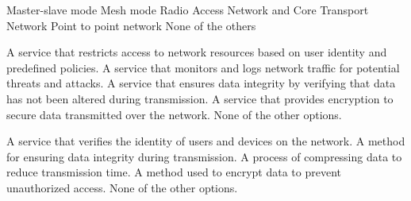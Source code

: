 \begin{checkboxes}
    \CorrectChoice Master-slave mode
    \CorrectChoice Mesh mode
    \choice Radio Access Network and Core Transport Network
    \choice Point to point network
    \choice None of the others
\end{checkboxes}

\begin{checkboxes}
    \CorrectChoice A service that restricts access to network resources based on user identity and predefined policies.
    \choice A service that monitors and logs network traffic for potential threats and attacks.
    \choice A service that ensures data integrity by verifying that data has not been altered during transmission.
    \choice A service that provides encryption to secure data transmitted over the network.
    \choice None of the other options.
\end{checkboxes}

\begin{checkboxes}
    \choice A service that verifies the identity of users and devices on the network.
    \choice A method for ensuring data integrity during transmission.
    \choice A process of compressing data to reduce transmission time.
    \choice A method used to encrypt data to prevent unauthorized access.
    \CorrectChoice None of the other options.
\end{checkboxes}
